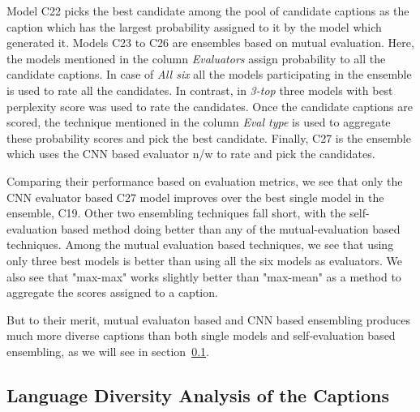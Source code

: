Model C22 picks the best candidate among the pool of candidate captions as the
caption which has the largest probability assigned to it by the model which
generated it.
Models C23 to C26 are ensembles based on mutual evaluation.
Here, the models mentioned in the column \emph{Evaluators} assign probability to
all the candidate captions.
In case of \emph{All six} all the models participating in the ensemble is used
to rate all the candidates.
In contrast, in \emph{3-top} three models with best perplexity score was used to
rate the candidates.
Once the candidate captions are scored, the technique mentioned in the column
\emph{Eval type} is used to aggregate these probability scores and pick the best
candidate. 
Finally, C27 is the ensemble which uses the CNN based evaluator n/w to rate and
pick the candidates.

Comparing their performance based on evaluation metrics, we see that only the
CNN evaluator based C27 model improves over the best single model in the
ensemble, C19.
Other two ensembling techniques fall short, with the self-evaluation based
method doing better than any of the mutual-evaluation based techniques.
Among the mutual evaluation based techniques, we see that using only three best
models is better than using all the six models as evaluators.
We also see that "max-max" works slightly better than "max-mean" as a method to
aggregate the scores assigned to a caption.

But to their merit, mutual evaluaton based and CNN based ensembling produces
much more diverse captions than both single models and self-evaluation based
ensembling, as we will see in section~\ref{subsubsec:QualAnalCoc}.

\subsection{Language Diversity Analysis of the Captions}
\label{subsubsec:QualAnalCoc}


